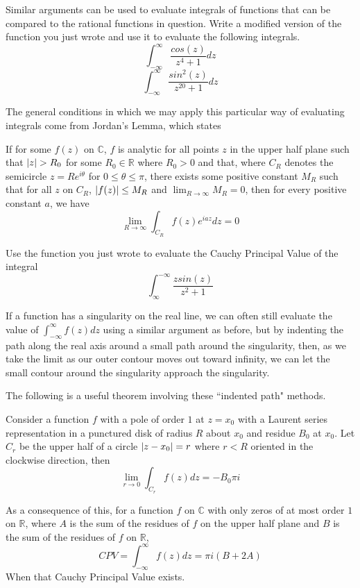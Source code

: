 \begin{problem}
Similar arguments can be used to evaluate integrals of functions that can be compared to the rational functions in question. Write a modified version of the function you just wrote and use it to evaluate the following integrals.
$$\int_{-\infty}^{\infty}\frac{cos(z)}{z^4+1}dz$$
$$\int_{-\infty}^{\infty}\frac{sin^2(z)}{z^{20}+1}dz$$
\end{problem}

The general conditions in which we may apply this particular way of evaluating integrals come from Jordan's Lemma, which states
\begin{lemma}
If for some $f(z)$ on $\mathbb{C}$, $f$ is analytic for all points $z$ in the upper half plane such that $\left\lvert z\right\rvert>R_0$ for some $R_0 \in \mathbb{R}$ where $R_0 >0$ and that, where $C_R$ denotes the semicircle $z=Re^{i\theta}$ for $0\leq \theta \leq \pi$, there exists some positive constant $M_R$ such that for all $z$ on $C_R$, $\left\lvert f(z)\right\rvert \leq M_R$ and $\lim_{R \to \infty} M_R = 0$, then for every positive constant $a$, we have $$\lim_{R \to \infty} \int_{C_R} f(z) e^{iaz} dz = 0$$
\end{lemma}
\begin{problem}
Use the function you just wrote to evaluate the Cauchy Principal Value of the integral
$$\int_{\infty}^{-\infty} \frac{z sin(z)}{z^2+1}$$
\end{problem}

If a function has a singularity on the real line, we can often still evaluate the value of $\int_{-\infty}^{\infty} f(z) dz$ using a similar argument as before, but by indenting the path along the real axis around a small path around the singularity, then, as we take the limit as our outer contour moves out toward infinity, we can let the small contour around the singularity approach the singularity.

The following is a useful theorem involving these ``indented path" methods.
\begin{theorem}
Consider a function $f$ with a pole of order $1$ at $z=x_0$ with a Laurent series representation in a punctured disk of radius $R$ about $x_0$ and residue $B_0$ at $x_0$. Let $C_r$ be the upper half of a circle $\left\lvert z-x_0\right\rvert=r$ where $r<R$ oriented in the clockwise direction, then
$$\lim_{r\to 0} \int_{C_r} f(z) dz = - B_0 \pi i$$
\end{theorem}
As a consequence of this, for a function $f$ on $\mathbb{C}$ with only zeros of at most order $1$ on $\mathbb{R}$, where $A$ is the sum of the residues of $f$ on the upper half plane and $B$ is the sum of the residues of $f$ on $\mathbb{R}$, 
$$CPV = \int_{-\infty}^{\infty} f(z) dz = \pi i (B+2A)$$ 
When that Cauchy Principal Value exists.

